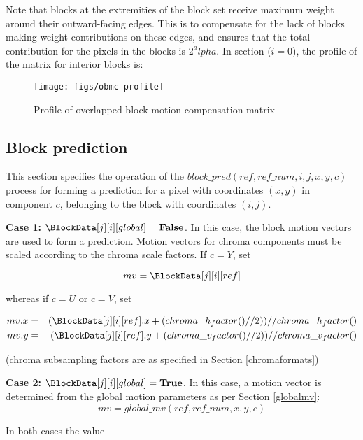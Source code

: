 Note that blocks at the extremities of the block set receive maximum weight around their outward-facing edges.
This is to compensate for the lack of blocks making weight contributions on these edges, and ensures that
the total contribution for the pixels in the blocks is $2^alpha$. In section ($i=0$), the profile of the matrix 
for interior blocks is:

\begin{figure}[!h]
\centering
\texttt{[image: figs/obmc-profile]}
\caption{Profile of overlapped-block motion compensation matrix}
\label{fig:weightprofile}
\end{figure}

\subsection{Block prediction}
\label{blockprediction}

This section specifies the operation of the $block\_pred(ref, ref\_num, i, j, x, y, c)$ 
process for forming a prediction for a pixel 
with coordinates $(x,y)$ in component $c$, belonging to the block with coordinates $(i,j)$.

{\bf Case 1: $\BlockData[j][i][global]=\false$}. In this case, the block motion vectors are used to form a prediction.
Motion vectors for chroma components must be scaled according to the chroma scale factors. If $c=Y$, set

\begin{equation*}
mv= \BlockData[j][i][ref]
\end{equation*}

whereas if $c=U$ or $c=V$, set

\begin{eqnarray*}
mv.x & = & (\BlockData[j][i][ref].x +(chroma\_h_factor()//2) )//chroma\_h_factor() \\
mv.y & = & (\BlockData[j][i][ref].y +(chroma\_v_factor()//2) )//chroma\_v_factor()
\end{eqnarray*}

(chroma subsampling factors are as specified in Section \ref{chromaformats})

{\bf Case 2: $\BlockData[j][i][global]=\true$}. In this case, a motion vector is determined from the global
motion parameters as per Section \ref{globalmv}:
\begin{equation*}
mv=global\_mv(ref, ref\_num, x, y, c)
\end{equation*}

In both cases the value 


